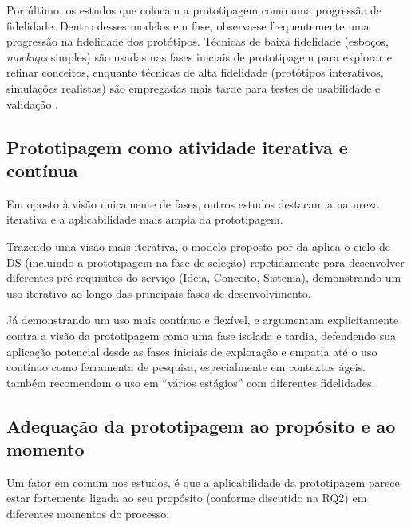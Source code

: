 Por último, os estudos que colocam a prototipagem como uma progressão de fidelidade. Dentro desses modelos em fase, observa-se frequentemente uma progressão na fidelidade dos protótipos. Técnicas de baixa fidelidade (esboços, \textit{mockups} simples) são usadas nas fases iniciais de prototipagem para explorar e refinar conceitos, enquanto técnicas de alta fidelidade (protótipos interativos, simulações realistas) são empregadas mais tarde para testes de usabilidade e validação \cite{asbjornsen2022echange, villa2022integratedcare, kumar2023rheumatology, hegemann2024palette, yan2022pssvalue}.

\subsection{Prototipagem como atividade iterativa e contínua}

Em oposto à visão unicamente de fases, outros estudos destacam a natureza iterativa e a aplicabilidade mais ampla da prototipagem.

Trazendo uma visão mais iterativa, o modelo proposto por da  aplica o ciclo de DS (incluindo a prototipagem na fase de seleção) repetidamente para desenvolver diferentes pré-requisitos do serviço (Ideia, Conceito, Sistema), demonstrando um uso iterativo ao longo das principais fases de desenvolvimento.

Já demonstrando um uso mais contínuo e flexível,  e  argumentam explicitamente contra a visão da prototipagem como uma fase isolada e tardia, defendendo sua aplicação potencial desde as fases iniciais de exploração e empatia até o uso contínuo como ferramenta de pesquisa, especialmente em contextos ágeis.  também recomendam o uso em ``vários estágios'' com diferentes fidelidades.

\subsection{Adequação da prototipagem ao propósito e ao momento}

Um fator em comum nos estudos, é que a aplicabilidade da prototipagem parece estar fortemente ligada ao seu propósito (conforme discutido na RQ2) em diferentes momentos do processo:

